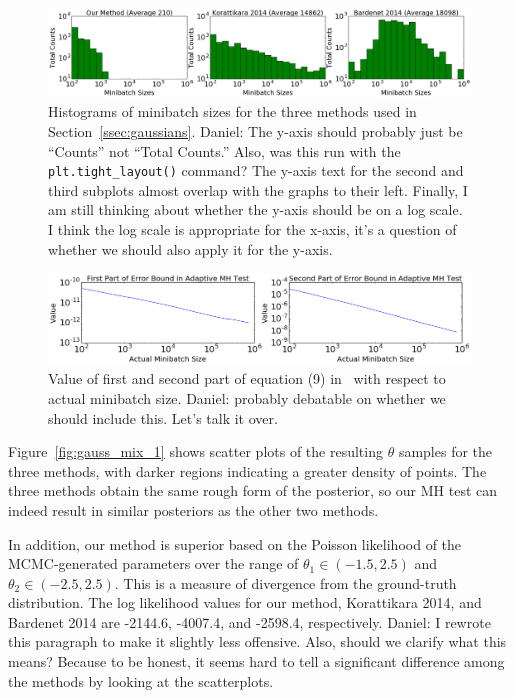 \documentclass{article}
\begin{document}
\begin{figure}[t]
    \centering
    \includegraphics[width=1\linewidth]{GaussianMixtureResult/minibatch_size_gaussian.png}
    \caption{
    Histograms of minibatch sizes for the three methods used in
    Section~\ref{ssec:gaussians}. {\color{blue} Daniel: The y-axis should
    probably just be ``Counts'' not ``Total Counts.'' Also, was this run with
    the \texttt{plt.tight\_layout()} command? The y-axis text for the second and
    third subplots almost overlap with the graphs to their left. Finally, I am
    still thinking about whether the y-axis should be on a log scale. I think
    the log scale is appropriate for the x-axis, it's a question of whether we
    should also apply it for the y-axis.}
    }
    \label{fig:gauss_mix_2}
\end{figure}

\begin{figure}[t]
	\centering
	\includegraphics[width=\linewidth]{GaussianMixtureResult/first_second_part_gaussian.png}
	\caption{
    Value of first and second part of equation (9)
    in~\cite{icml2014c1_bardenet14} with respect to actual minibatch size.
    {\color{blue} Daniel: probably debatable on whether we should include this.
    Let's talk it over.}
    }
	\label{fig:gauss_bardenet}
\end{figure}

Figure~\ref{fig:gauss_mix_1} shows scatter plots of the resulting $\theta$
samples for the three methods, with darker regions indicating a greater density
of points. The three methods obtain the same rough form of the posterior, so our
MH test can indeed result in similar posteriors as the other two methods.

In addition, our method is superior based on the Poisson likelihood of the
MCMC-generated parameters over the range of $\theta_1 \in (-1.5, 2.5)$ and
$\theta_2 \in (-2.5, 2.5)$. This is a measure of divergence from the
ground-truth distribution. The log likelihood values for our method, Korattikara
2014, and Bardenet 2014 are -2144.6, -4007.4, and -2598.4, respectively.
{\color{blue} Daniel: I rewrote this paragraph to make it slightly less
offensive. Also, should we clarify what this means? Because to be honest, it
seems hard to tell a significant difference among the methods by looking at the
scatterplots.}
\end{document}
